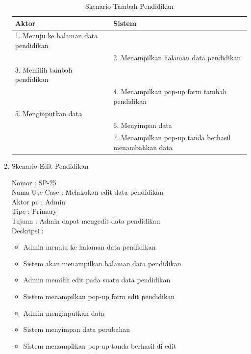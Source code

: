 \begin{enumerate}
\begin{table}
	\caption{Skenario Tambah Pendidikan}
	\centering
	\begin{tabular}{ | l | p{62mm} |}
		\hline 
		\textbf{Aktor} & \textbf{Sistem} \\
		\hline
		
		1.	Menuju ke halaman data pendidikan &  \\
		
		\hline
		
		&  2.	Menampilkan halaman data pendidikan \\
		
		\hline
		
		3. Memilih tambah pendidikan & \\
		
		\hline
		
		& 4.	Menampilkan pop-up form tambah pendidikan \\
		
		\hline
		
		5.	Menginputkan data  & \\
		\hline
		
		& 6.	Menyimpan data \\
		\hline
		
		& 7.	Menampilkan pop-up tanda berhasil menambahkan data \\
		\hline
		
	\end{tabular}
\end{table}

\item Skenario Edit Pendidikan

Nomor \kern 3.6pc : SP-25 \\
Nama Use Case : Melakukan edit data pendidikan \\
Aktor  pc : Admin \\
Tipe \kern 4.6pc : Primary \\
Tujuan \kern 3.6pc : Admin dapat mengedit data pendidikan \\
Deskripsi \kern 2.5pc : 

\begin{itemize}
	\item Admin menuju ke halaman data pendidikan
	\item Sistem akan menampilkan halaman data pendidikan
	\item Admin memilih edit pada suatu data pendidikan
	\item Sistem menampilkan pop-up form edit pendidikan
	\item Admin menginputkan data
	\item Sistem menyimpan data perubahan
	\item Sistem menampilkan pop-up tanda berhasil di edit
	

\end{itemize}
\end{enumerate}
